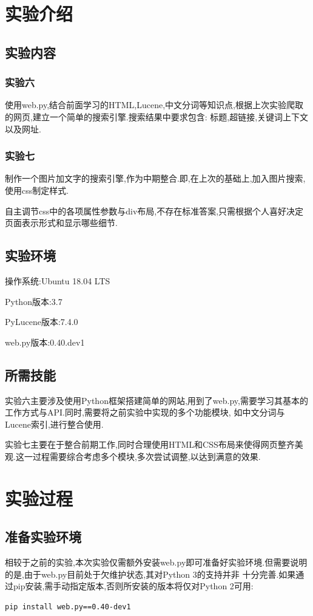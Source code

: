 \documentclass[a4paper]{article}
\begin{document}
    \tableofcontents
    \newpage
    \section{实验介绍}
        \subsection{实验内容}
            \subsubsection{实验六}
使用web.py,结合前面学习的HTML,Lucene,中文分词等知识点,根据上次实验爬取的网页,建立一个简单的搜索引擎.搜索结果中要求包含:
标题,超链接,关键词上下文以及网址.
            \subsubsection{实验七}
制作一个图片加文字的搜索引擎,作为中期整合.即,在上次的基础上,加入图片搜索,使用css制定样式.

自主调节css中的各项属性参数与div布局,不存在标准答案,只需根据个人喜好决定页面表示形式和显示哪些细节.

        \subsection{实验环境}
操作系统:Ubuntu 18.04 LTS

Python版本:3.7

PyLucene版本:7.4.0

web.py版本:0.40.dev1
        \subsection{所需技能}
实验六主要涉及使用Python框架搭建简单的网站,用到了web.py,需要学习其基本的工作方式与API.同时,需要将之前实验中实现的多个功能模块,
如中文分词与Lucene索引,进行整合使用.

实验七主要在于整合前期工作,同时合理使用HTML和CSS布局来使得网页整齐美观.这一过程需要综合考虑多个模块,多次尝试调整,以达到满意的效果.
    \newpage
    \section{实验过程}
        \subsection{准备实验环境}
相较于之前的实验,本次实验仅需额外安装web.py即可准备好实验环境.但需要说明的是,由于web.py目前处于欠维护状态,其对Python 3的支持并非
十分完善.如果通过pip安装,需手动指定版本,否则所安装的版本将仅对Python 2可用:
\begin{verbatim}
pip install web.py==0.40-dev1
\end{verbatim}
\end{document}
